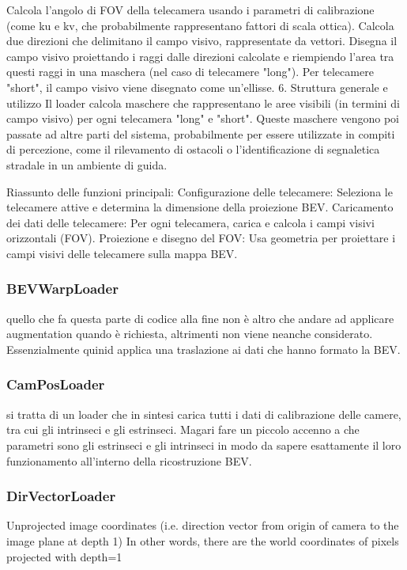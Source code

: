 Calcola l'angolo di FOV della telecamera usando i parametri di calibrazione (come ku e kv, che probabilmente rappresentano fattori di scala ottica).
Calcola due direzioni che delimitano il campo visivo, rappresentate da vettori.
Disegna il campo visivo proiettando i raggi dalle direzioni calcolate e riempiendo l'area tra questi raggi in una maschera (nel caso di telecamere "long").
Per telecamere "short", il campo visivo viene disegnato come un'ellisse.
6. Struttura generale e utilizzo
Il loader calcola maschere che rappresentano le aree visibili (in termini di campo visivo) per ogni telecamera "long" e "short". Queste maschere vengono poi passate ad altre parti del sistema, probabilmente per essere utilizzate in compiti di percezione, come il rilevamento di ostacoli o l'identificazione di segnaletica stradale in un ambiente di guida.

Riassunto delle funzioni principali:
Configurazione delle telecamere: Seleziona le telecamere attive e determina la dimensione della proiezione BEV.
Caricamento dei dati delle telecamere: Per ogni telecamera, carica e calcola i campi visivi orizzontali (FOV).
Proiezione e disegno del FOV: Usa geometria per proiettare i campi visivi delle telecamere sulla mappa BEV.

\subsubsection{BEVWarpLoader}


quello che fa questa parte di codice alla fine non è altro che andare ad applicare augmentation quando è richiesta, altrimenti non viene neanche considerato. Essenzialmente quinid applica una traslazione ai dati che hanno formato la BEV. 

\subsubsection{CamPosLoader}
si tratta di un loader che in sintesi carica tutti i dati di calibrazione delle camere, tra cui gli intrinseci e gli estrinseci. 
Magari fare un piccolo accenno a che parametri sono gli estrinseci e gli intrinseci in modo da sapere esattamente il loro funzionamento all'interno della ricostruzione BEV.


\subsubsection{DirVectorLoader}
Unprojected image coordinates
(i.e. direction vector from origin of camera to the image plane at depth 1)
In other words, there are the world coordinates of pixels projected with depth=1


